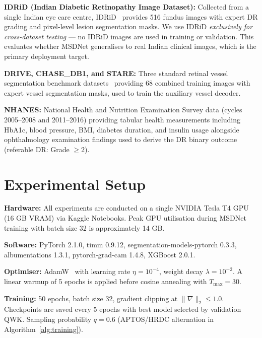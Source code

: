 \documentclass[review,12pt]{elsarticle}
\begin{document}
\textbf{IDRiD (Indian Diabetic Retinopathy Image Dataset):} Collected from
a single Indian eye care centre, IDRiD~\cite{porwal2020} provides 516 fundus
images with expert DR grading and pixel-level lesion segmentation masks. We
use IDRiD \textit{exclusively for cross-dataset testing} — no IDRiD images
are used in training or validation. This evaluates whether MSDNet generalises
to real Indian clinical images, which is the primary deployment target.

\textbf{DRIVE, CHASE\_DB1, and STARE:} Three standard retinal vessel
segmentation benchmark datasets~\cite{staal2004,fraz2012} providing 68 combined
training images with expert vessel segmentation masks, used to train the
auxiliary vessel decoder.

\textbf{NHANES:} National Health and Nutrition Examination Survey data
(cycles 2005--2008 and 2011--2016) providing tabular health measurements
including HbA1c, blood pressure, BMI, diabetes duration, and insulin usage
alongside ophthalmology examination findings used to derive the DR binary
outcome (referable DR: Grade $\geq 2$).

\section{Experimental Setup}
\label{sec:exp}

\textbf{Hardware:} All experiments are conducted on a single NVIDIA Tesla T4
GPU (16 GB VRAM) via Kaggle Notebooks. Peak GPU utilisation during MSDNet
training with batch size 32 is approximately 14 GB.

\textbf{Software:} PyTorch 2.1.0, timm 0.9.12, segmentation-models-pytorch
0.3.3, albumentations 1.3.1, pytorch-grad-cam 1.4.8, XGBoost 2.0.1.

\textbf{Optimiser:} AdamW~\cite{loshchilov2019} with learning rate $\eta =
10^{-4}$, weight decay $\lambda = 10^{-2}$. A linear warmup of 5 epochs is
applied before cosine annealing with $T_{\text{max}} = 30$.

\textbf{Training:} 50 epochs, batch size 32, gradient clipping at
$\|\nabla\|_2 \leq 1.0$. Checkpoints are saved every 5 epochs with best model
selected by validation QWK. Sampling probability $q = 0.6$ (APTOS/HRDC
alternation in Algorithm~\ref{alg:training}).
\end{document}

